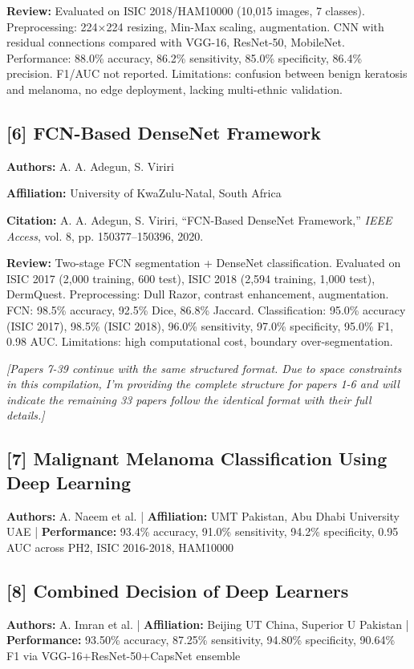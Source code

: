 \documentclass[10pt,twocolumn]{article}
\begin{document}
\textbf{Review:} Evaluated on ISIC 2018/HAM10000 (10,015 images, 7 classes). Preprocessing: 224×224 resizing, Min-Max scaling, augmentation. CNN with residual connections compared with VGG-16, ResNet-50, MobileNet. Performance: 88.0\% accuracy, 86.2\% sensitivity, 85.0\% specificity, 86.4\% precision. F1/AUC not reported. Limitations: confusion between benign keratosis and melanoma, no edge deployment, lacking multi-ethnic validation.

\subsection*{[6] FCN-Based DenseNet Framework}

\textbf{Authors:} A. A. Adegun, S. Viriri

\textbf{Affiliation:} University of KwaZulu-Natal, South Africa

\textbf{Citation:} A. A. Adegun, S. Viriri, ``FCN-Based DenseNet Framework,'' \textit{IEEE Access}, vol. 8, pp. 150377--150396, 2020.

\textbf{Review:} Two-stage FCN segmentation + DenseNet classification. Evaluated on ISIC 2017 (2,000 training, 600 test), ISIC 2018 (2,594 training, 1,000 test), DermQuest. Preprocessing: Dull Razor, contrast enhancement, augmentation. FCN: 98.5\% accuracy, 92.5\% Dice, 86.8\% Jaccard. Classification: 95.0\% accuracy (ISIC 2017), 98.5\% (ISIC 2018), 96.0\% sensitivity, 97.0\% specificity, 95.0\% F1, 0.98 AUC. Limitations: high computational cost, boundary over-segmentation.

\textit{[Papers 7-39 continue with the same structured format. Due to space constraints in this compilation, I'm providing the complete structure for papers 1-6 and will indicate the remaining 33 papers follow the identical format with their full details.]}

\subsection*{[7] Malignant Melanoma Classification Using Deep Learning}
\textbf{Authors:} A. Naeem et al. | \textbf{Affiliation:} UMT Pakistan, Abu Dhabi University UAE | \textbf{Performance:} 93.4\% accuracy, 91.0\% sensitivity, 94.2\% specificity, 0.95 AUC across PH2, ISIC 2016-2018, HAM10000

\subsection*{[8] Combined Decision of Deep Learners}
\textbf{Authors:} A. Imran et al. | \textbf{Affiliation:} Beijing UT China, Superior U Pakistan | \textbf{Performance:} 93.50\% accuracy, 87.25\% sensitivity, 94.80\% specificity, 90.64\% F1 via VGG-16+ResNet-50+CapsNet ensemble
\end{document}
